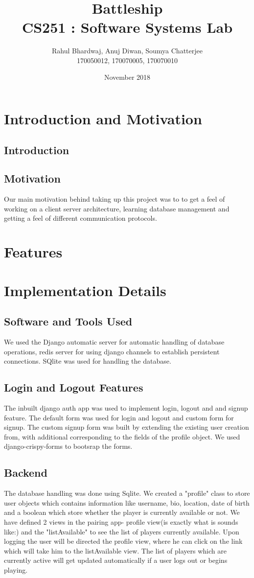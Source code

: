 \documentclass[titlepage]{article}
\title{\textbf{Battleship} \\ CS251 : Software Systems Lab}
\author{Rahul Bhardwaj, Anuj Diwan, Soumya Chatterjee \\ 170050012, 170070005, 170070010}
\date{November 2018}
\begin{document}
\maketitle

\tableofcontents

\break

\section{Introduction and Motivation}
\subsection{Introduction}
\subsection{Motivation}
Our main motivation behind taking up this project was to to get a feel of working on a client server architecture, learning database management and getting a feel of different communication protocols.

\section{Features}

\section{Implementation Details}
\subsection{Software and Tools Used}
We used the Django automatic server for automatic handling of database operations, redis server for using django channels to establish persistent connections. SQlite was used for handling the database.
\subsection{Login and Logout Features}
The inbuilt django auth app was used to implement login, logout and and signup feature. The default form was used for login and logout and custom form for signup. The custom signup form was built by extending the existing user creation from, with additional corresponding to the fields of the profile object. We used django-crispy-forms to bootsrap the forms.
\subsection{Backend}
 The database handling was done using Sqlite. We created a "profile" class to store user objects which contains information like username, bio, location, date of birth and a boolean which store whether the player is currently available or not. We have defined 2 views in the pairing app- profile view(is exactly what is sounds like:) and the "listAvailable" to see the list of players currently available. Upon logging the user will be directed the profile view, where he can click on the link which will take him to the listAvailable view. The list of players which are currently active will get updated automatically if a user logs out or begins playing.
\end{document}
